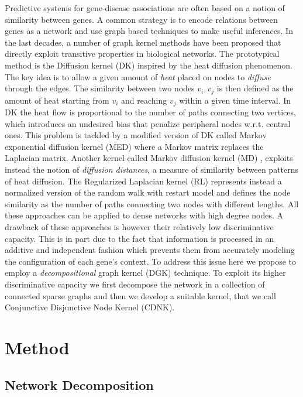 \documentclass{esannV2}
\begin{document}
Predictive systems for gene-disease associations are often based on a notion
of similarity between genes. A common strategy is to encode relations between
genes as a network and use graph based techniques to make useful inferences.
In the last decades, a number of graph kernel methods have been proposed that
directly exploit transitive properties in biological networks. The
prototypical method is the Diffusion kernel (DK) \cite{ledk} inspired by the
heat diffusion phenomenon. The key idea is to allow a given amount of {\em
heat} placed on nodes to {\em diffuse} through the edges. The similarity
between two nodes $v_{i}, v_{j}$ is then defined as the amount of heat
starting from $v_{i}$ and reaching $v_{j}$ within a given time interval. In DK
the heat flow is proportional to the number of paths connecting two vertices,
which introduces an undesired bias that penalize peripheral nodes w.r.t.
central ones. This problem is tackled by a modified version of DK called
Markov exponential diffusion kernel (MED) \cite{medk} where a Markov matrix
replaces the Laplacian matrix.  Another kernel called Markov diffusion kernel
(MD) \cite{mdk}, exploits instead the notion of {\em diffusion distances}, a
measure of similarity between patterns of heat diffusion. The Regularized
Laplacian kernel (RL) \cite{rlk} represents instead a normalized version of
the random walk with restart model and defines the node similarity as the
number of paths connecting two nodes with different lengths. All these
approaches can be applied to dense networks with high degree nodes. A drawback
of these approaches is however their relatively low discriminative capacity.
This is in part due to the fact that information is processed in an additive
and independent fashion which prevents them from accurately modeling the
configuration of each gene's context. To address this issue here we propose to
employ a {\em decompositional} graph kernel (DGK) \cite{covolution_kernel}
technique. To exploit its higher discriminative capacity we first decompose
the network in a collection of connected sparse graphs and then we develop a
suitable kernel, that we call Conjunctive Disjunctive Node Kernel (CDNK).


\section{Method}\label{method}

\subsection{Network Decomposition}
\end{document}
